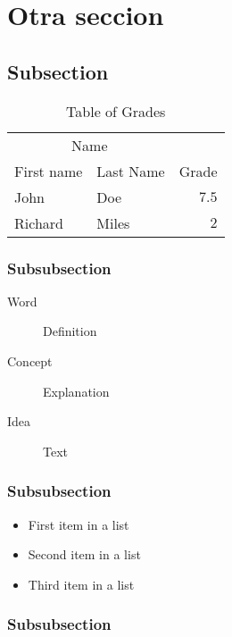 \documentclass[fleqn,10pt]{SelfArx} %
\begin{document}
\section{Otra seccion}

\lipsum[10] %

\subsection{Subsection}

\lipsum[11] %

\begin{table}[hbt]
\caption{Table of Grades}
\centering
\begin{tabular}{llr}
\toprule
\multicolumn{2}{c}{Name} \\
\cmidrule(r){1-2}
First name & Last Name & Grade \\
\midrule
John & Doe & $7.5$ \\
Richard & Miles & $2$ \\
\bottomrule
\end{tabular}
\label{tab:label}
\end{table}

\subsubsection{Subsubsection}

\lipsum[12] %

\begin{description}
\item[Word] Definition
\item[Concept] Explanation
\item[Idea] Text
\end{description}

\subsubsection{Subsubsection}

\lipsum[13] %

\begin{itemize}[noitemsep] %
\item First item in a list
\item Second item in a list
\item Third item in a list
\end{itemize}

\subsubsection{Subsubsection}
\end{document}
